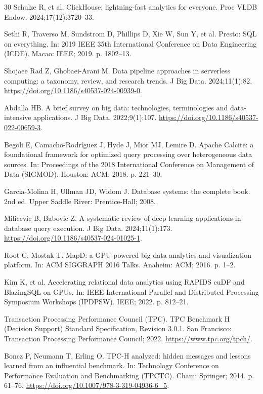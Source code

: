 \documentclass[10pt,a4paper]{article}
\begin{document}
{\begin{thebibliography}{30}
Schulze R, et al. ClickHouse: lightning-fast analytics for everyone. Proc VLDB Endow. 2024;17(12):3720--33.

Sethi R, Traverso M, Sundstrom D, Phillips D, Xie W, Sun Y, et al. Presto: SQL on everything. In: 2019 IEEE 35th International Conference on Data Engineering (ICDE). Macao: IEEE; 2019. p. 1802--13.

 Shojaee Rad Z, Ghobaei-Arani M. Data pipeline approaches in serverless computing: a taxonomy, review, and research trends. J Big Data. 2024;11(1):82. \url{https://doi.org/10.1186/s40537-024-00939-0}.

Abdalla HB. A brief survey on big data: technologies, terminologies and data-intensive applications. J Big Data. 2022;9(1):107. \url{https://doi.org/10.1186/s40537-022-00659-3}.

Begoli E, Camacho-Rodr{\'i}guez J, Hyde J, Mior MJ, Lemire D. Apache Calcite: a foundational framework for optimized query processing over heterogeneous data sources. In: Proceedings of the 2018 International Conference on Management of Data (SIGMOD). Houston: ACM; 2018. p. 221--30.

Garcia-Molina H, Ullman JD, Widom J. Database systems: the complete book. 2nd ed. Upper Saddle River: Prentice-Hall; 2008.

Milicevic B, Babovic Z. A systematic review of deep learning applications in database query execution. J Big Data. 2024;11(1):173. \url{https://doi.org/10.1186/s40537-024-01025-1}.

Root C, Mostak T. MapD: a GPU-powered big data analytics and visualization platform. In: ACM SIGGRAPH 2016 Talks. Anaheim: ACM; 2016. p. 1--2.

Kim K, et al. Accelerating relational data analytics using RAPIDS cuDF and BlazingSQL on GPUs. In: IEEE International Parallel and Distributed Processing Symposium Workshops (IPDPSW). IEEE; 2022. p. 812--21.

Transaction Processing Performance Council (TPC). TPC Benchmark H (Decision Support) Standard Specification, Revision 3.0.1. San Francisco: Transaction Processing Performance Council; 2022. \url{https://www.tpc.org/tpch/}.

Boncz P, Neumann T, Erling O. TPC-H analyzed: hidden messages and lessons learned from an influential benchmark. In: Technology Conference on Performance Evaluation and Benchmarking (TPCTC). Cham: Springer; 2014. p. 61--76. \url{https://doi.org/10.1007/978-3-319-04936-6_5}.


\end{thebibliography}}
\end{document}
